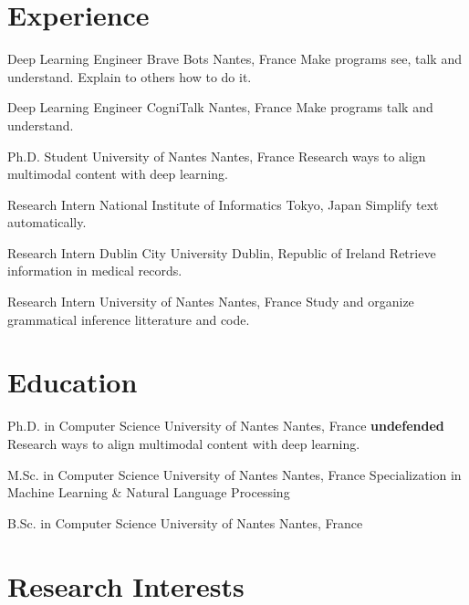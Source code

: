 \documentclass[11pt,a4paper,sans]{moderncv}        %
\newcommand{\textover}[3][l]{%
  \makebox[\widthof{#3}][#1]{#2}%
}
\begin{document}
\makecvtitle

\section{Experience}

\cventry{03/17–\textover{now}{03/18}}%
{Deep Learning Engineer}%
{Brave Bots}%
{Nantes, France}%
{}%
{Make programs see, talk and understand. Explain to others how to do
  it.}

%
{Deep Learning Engineer}%
{CogniTalk}%
{Nantes, France}%
{}%
{Make programs talk and understand.}

%
{Ph.D. Student}%
{University of Nantes}%
{Nantes, France}%
{}%
{Research ways to align multimodal content with deep learning.}

%
{Research Intern}%
{National Institute of Informatics}%
{Tokyo, Japan}%
{}%
{Simplify text automatically.}

%
{Research Intern}%
{Dublin City University}%
{Dublin, Republic of Ireland}%
{}%
{Retrieve information in medical records.}

%
{Research Intern}%
{University of Nantes}%
{Nantes, France}%
{}%
{Study and organize grammatical inference litterature and code.}

\section{Education}

%
{Ph.D. in Computer Science}%
{University of Nantes}%
{Nantes, France}%
{\textbf{undefended}}%
{Research ways to align multimodal content with deep learning.}

%
{M.Sc. in Computer Science}%
{University of Nantes}%
{Nantes, France}%
{}%
{Specialization in Machine Learning \& Natural Language Processing}

%
{B.Sc. in Computer Science}%
{University of Nantes}%
{Nantes, France}%
{}%
{}

\section{Research Interests}
\end{document}
